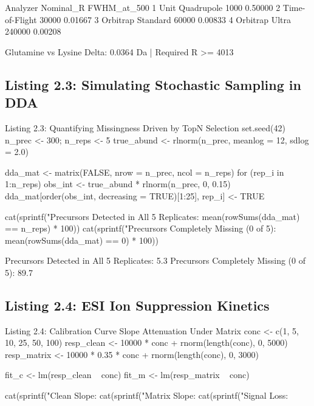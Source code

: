 \documentclass[11pt,twoside,openright]{book}
\begin{document}
\begin{routput}
           Analyzer Nominal\_R FWHM\_at\_500
1   Unit Quadrupole      1000     0.50000
2    Time-of-Flight     30000     0.01667
3 Orbitrap Standard     60000     0.00833
4    Orbitrap Ultra    240000     0.00208

Glutamine vs Lysine Delta: 0.0364 Da | Required R >= 4013
\end{routput}

\subsection{Listing 2.3: Simulating Stochastic Sampling in DDA}

\begin{rchunk}{Listing 2.3: Quantifying Missingness Driven by TopN Selection}
set.seed(42)
n_prec <- 300; n_reps <- 5
true_abund <- rlnorm(n_prec, meanlog = 12, sdlog = 2.0)

dda_mat <- matrix(FALSE, nrow = n_prec, ncol = n_reps)
for (rep_i in 1:n_reps) {
  obs_int <- true_abund * rlnorm(n_prec, 0, 0.15)
  dda_mat[order(obs_int, decreasing = TRUE)[1:25], rep_i] <- TRUE
}

cat(sprintf("Precursors Detected in All 5 Replicates: %
            mean(rowSums(dda_mat) == n_reps) * 100))
cat(sprintf("Precursors Completely Missing (0 of 5):   %
            mean(rowSums(dda_mat) == 0) * 100))
\end{rchunk}

\begin{routput}
Precursors Detected in All 5 Replicates: 5.3%
Precursors Completely Missing (0 of 5):   89.7%
\end{routput}

\subsection{Listing 2.4: ESI Ion Suppression Kinetics}

\begin{rchunk}{Listing 2.4: Calibration Curve Slope Attenuation Under Matrix}
conc <- c(1, 5, 10, 25, 50, 100)
resp_clean  <- 10000 * conc + rnorm(length(conc), 0, 5000)
resp_matrix <- 10000 * 0.35 * conc + rnorm(length(conc), 0, 3000)

fit_c <- lm(resp_clean ~ conc)
fit_m <- lm(resp_matrix ~ conc)

cat(sprintf("Clean Slope:  %
cat(sprintf("Matrix Slope: %
cat(sprintf("Signal Loss:  %
\end{rchunk}
\end{document}
